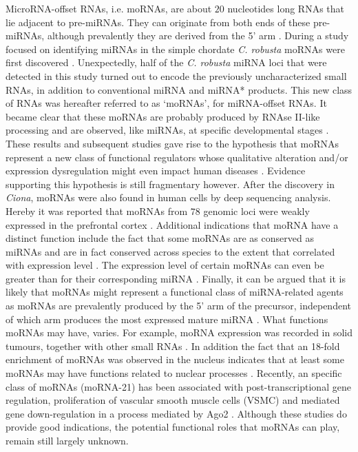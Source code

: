 \documentclass[graybox]{svmult}
\begin{document}
MicroRNA-offset RNAs, i.e. moRNAs, are about $20$ nucleotides long RNAs 
that lie adjacent to pre-miRNAs. They can originate from both ends of these 
pre-miRNAs, although prevalently they are derived from the 5' arm 
\citep{bortoluzzi2011}. During a study focused on identifying miRNAs in the 
simple chordate \textit{C. robusta} moRNAs were first discovered 
\citep{Shi2009}. Unexpectedly, half of the \textit{C. robusta} miRNA loci 
that were detected in this study turned out to encode the 
previously uncharacterized small RNAs, in addition to conventional miRNA and 
miRNA* products. This new class of RNAs was hereafter referred to as `moRNAs', 
for miRNA-offset RNAs. It became clear that these moRNAs are probably produced 
by RNAse II-like processing and are observed, like miRNAs, at specific 
developmental stages \citep{Shi2009}.
These results and subsequent studies gave rise to the hypothesis that moRNAs 
represent a new class of functional regulators whose qualitative alteration 
and/or expression dysregulation might even impact human diseases 
\citep{bortoluzzi2011}. Evidence supporting this hypothesis is still fragmentary 
however. After the discovery in \textit{Ciona}, moRNAs were 
also found in human cells by deep sequencing analysis. Hereby it was reported 
that moRNAs from $78$ genomic loci were weakly expressed in the prefrontal 
cortex \citep{Langenberger2009}. Additional indications that moRNA have a 
distinct function include the fact that some moRNAs are as conserved as miRNAs 
and are in fact conserved across species to the extent that correlated with 
expression level \citep{Shi2009}. The expression level of certain moRNAs can 
even be greater than for their corresponding miRNA \citep{Umbach2010}. Finally, 
it can be argued \citep{bortoluzzi2011} that it is likely that moRNAs might 
represent a functional class of miRNA-related agents as moRNAs are prevalently 
produced by the 5' arm of the precursor, independent of which arm produces the 
most expressed mature miRNA \citep{Langenberger2009, Umbach2010}. 
What functions moRNAs may have, varies. For example, moRNA expression was 
recorded in solid tumours, together with other small RNAs \citep{Meiri2010}. 
In addition the fact that an 18-fold enrichment of moRNAs was observed in the 
nucleus \citep{Taft2010} indicates that at least some moRNAs may have functions 
related to nuclear processes \citep{bortoluzzi2011}. Recently, an specific class 
of moRNAs (moRNA-21) has been associated with post-transcriptional gene 
regulation, proliferation of vascular smooth muscle cells (VSMC) and mediated 
gene down-regulation in a process mediated by Ago2 \citep{Zhao2016}. Although 
these studies do provide good indications, the potential functional roles that 
moRNAs can play, remain still largely unknown.
\end{document}
